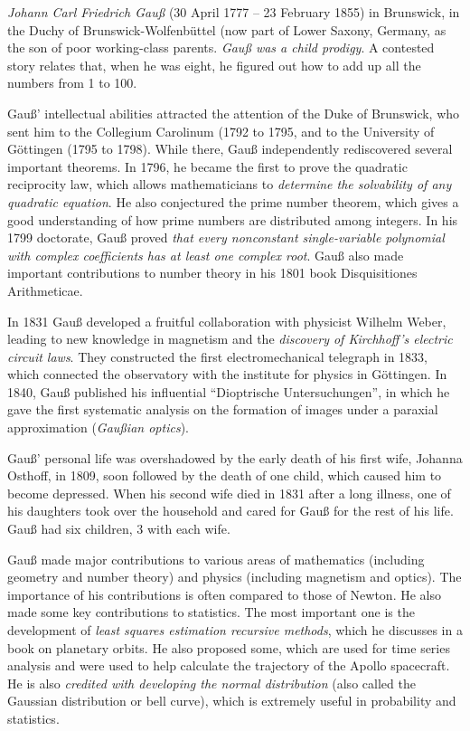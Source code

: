 \emph{Johann Carl Friedrich Gauß} (30 April 1777 – 23 February 1855) in Brunswick, in the Duchy of Brunswick-Wolfenbüttel (now part of Lower Saxony, Germany, as the son of poor working-class parents. \emph{Gauß was a child prodigy}. A contested story relates that, when he was eight, he figured out how to add up all the numbers from 1 to 100. 

Gauß' intellectual abilities attracted the attention of the Duke of Brunswick, who sent him to the Collegium Carolinum (1792 to 1795, and to the University of Göttingen (1795 to 1798). While there, Gauß independently rediscovered several important theorems. In 1796, he became the first to prove the quadratic reciprocity law, which allows mathematicians to \emph{determine the solvability of any quadratic equation}. He also conjectured the prime number theorem, which gives a good understanding of how prime numbers are distributed among integers. In his 1799 doctorate, Gauß proved \emph{that every nonconstant single-variable polynomial with complex coefficients has at least one complex root}.  Gauß also made important contributions to number theory in his 1801 book Disquisitiones Arithmeticae.

In 1831 Gauß developed a fruitful collaboration with physicist Wilhelm Weber, leading to new knowledge in magnetism and the \emph{discovery of Kirchhoff's electric circuit laws}. They constructed the first electromechanical telegraph in 1833, which connected the observatory with the institute for physics in Göttingen. In 1840, Gauß published his influential \enquote{Dioptrische Untersuchungen}, in which he gave the first systematic analysis on the formation of images under a paraxial approximation (\emph{Gaußian optics}).

Gauß' personal life was overshadowed by the early death of his first wife, Johanna Osthoff, in 1809, soon followed by the death of one child, which caused him to become depressed. When his second wife died in 1831 after a long illness, one of his daughters took over the household and cared for Gauß for the rest of his life. Gauß had six children, 3 with each wife. 
 
Gauß made major contributions to various areas of mathematics (including geometry and number theory) and physics (including magnetism and optics). The importance of his contributions is often compared to those of Newton. He also made some key contributions to statistics. The most important one is the development of \emph{least squares estimation recursive methods}, which he discusses in a book on planetary orbits. He also proposed some, which are used for time series analysis and were used to help calculate the trajectory of the Apollo spacecraft. He is also \emph{credited with developing the normal distribution} (also called the Gaussian distribution or bell curve), which is extremely useful in probability and statistics.
